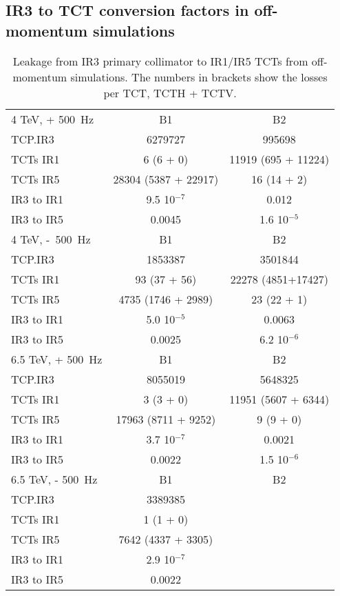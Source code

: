 \begin{table}
\begin{tabular}{c|cc|cc}
       \hline
   \end{tabular}
   \label{leakageFactorsIR7}
\end{table}


\subsection{IR3 to TCT conversion factors in off-momentum simulations}
\begin{table}[!h]
   \centering
   \caption{Leakage from IR3 primary collimator to IR1/IR5 TCTs from off-momentum simulations. The numbers in brackets show the losses per TCT, TCTH + TCTV. }

   \begin{tabular}{l|c|c}
       \hline
       4 TeV, + 500~Hz  & B1 & B2\\
       TCP.IR3  & 6279727 & 995698  \\
       TCTs IR1 & 6 (6 + 0) & 11919 (695 + 11224) \\
       TCTs IR5 & 28304 (5387 + 22917) & 16 (14 + 2) \\
       IR3 to IR1 & 9.5 10$^{-7}$ & 0.012 \\
       IR3 to IR5 & 0.0045 & 1.6 10$^{-5}$ \\
       \hline
       4 TeV, -~500~Hz  & B1 & B2\\
       TCP.IR3  & 1853387 & 3501844 \\
       TCTs IR1  & 93 (37 + 56) & 22278 (4851+17427) \\
       TCTs IR5  &  4735 (1746 + 2989) & 23 (22 + 1) \\
       IR3 to IR1 & 5.0 10$^{-5}$ & 0.0063 \\
       IR3 to IR5 & 0.0025 & 6.2 10$^{-6}$ \\
       \hline

       6.5 TeV, + 500~Hz  & B1 & B2\\
       TCP.IR3  & 8055019 & 5648325  \\
       TCTs IR1 & 3 (3 + 0) & 11951 (5607 + 6344) \\
       TCTs IR5 & 17963 (8711 + 9252) & 9 (9 + 0)\\
       IR3 to IR1 & 3.7 10$^{-7}$ & 0.0021 \\
       IR3 to IR5 & 0.0022 & 1.5 10$^{-6}$ \\
       \hline
       6.5 TeV, - 500~Hz  & B1 & B2\\
       TCP.IR3  &  3389385 &   \\
       TCTs IR1  &  1 (1 + 0) &   \\
       TCTs IR5  &  7642 (4337 + 3305) &  \\
       IR3 to IR1 &  2.9 10$^{-7}$ &  \\
       IR3 to IR5 &  0.0022 &   \\
       \hline


\end{tabular}
\end{table}
